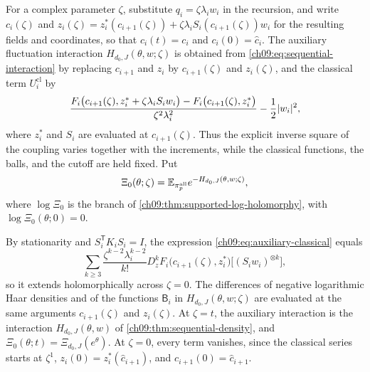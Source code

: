 \begin{definition}\label{ch09:conv:auxiliary-baseline}
For a complex parameter $\zeta$, substitute $q_i=\zeta\lambda_iw_i$ in the recursion, and write $c_i(\zeta)$ and $z_i(\zeta)=z_i^*(c_{i+1}(\zeta))+\zeta\lambda_iS_i(c_{i+1}(\zeta))w_i$ for the resulting fields and coordinates, so that $c_i(t)=c_i$ and $c_i(0)=\widehat c_i$. The auxiliary fluctuation interaction $H_{d_0,J}(\theta,w;\zeta)$ is obtained from \eqref{ch09:eq:sequential-interaction} by replacing $c_{i+1}$ and $z_i$ by $c_{i+1}(\zeta)$ and $z_i(\zeta)$, and the classical term $U_i^{\mathrm{cl}}$ by
\begin{equation}\label{ch09:eq:auxiliary-classical}
 \frac{F_i\bigl(c_{i+1}(\zeta),z_i^*+\zeta\lambda_iS_iw_i\bigr)-F_i\bigl(c_{i+1}(\zeta),z_i^*\bigr)}{\zeta^2\lambda_i^2}-\frac12\lvert w_i\rvert^2,
\end{equation}
where $z_i^*$ and $S_i$ are evaluated at $c_{i+1}(\zeta)$. Thus the explicit inverse square of the coupling varies together with the increments, while the classical functions, the balls, and the cutoff are held fixed. Put
\begin{equation}\label{ch09:eq:auxiliary-baseline}
 \Xi_0(\theta;\zeta)=\mathbb E_{\pi_p^{\mathrm{all}}}e^{-H_{d_0,J}(\theta,w;\zeta)},
\end{equation}
where $\log\Xi_0$ is the branch of \cref{ch09:thm:supported-log-holomorphy}, with $\log\Xi_0(\theta;0)=0$.
\end{definition}

By stationarity and $S_i^{\mathsf T}K_iS_i=I$, the expression \eqref{ch09:eq:auxiliary-classical} equals
\[
 \sum_{k\ge3}\frac{\zeta^{k-2}\lambda_i^{k-2}}{k!}D_z^kF_i\bigl(c_{i+1}(\zeta),z_i^*\bigr)\bigl[(S_iw_i)^{\otimes k}\bigr],
\]
so it extends holomorphically across $\zeta=0$. The differences of negative logarithmic Haar densities and of the functions $\mathsf B_i$ in $H_{d_0,J}(\theta,w;\zeta)$ are evaluated at the same arguments $c_{i+1}(\zeta)$ and $z_i(\zeta)$. At $\zeta=t$, the auxiliary interaction is the interaction $H_{d_0,J}(\theta,w)$ of \cref{ch09:thm:sequential-density}, and $\Xi_0(\theta;t)=\Xi_{d_0,J}(e^\theta)$. At $\zeta=0$, every term vanishes, since the classical series starts at $\zeta^1$, $z_i(0)=z_i^*(\widehat c_{i+1})$, and $c_{i+1}(0)=\widehat c_{i+1}$.

